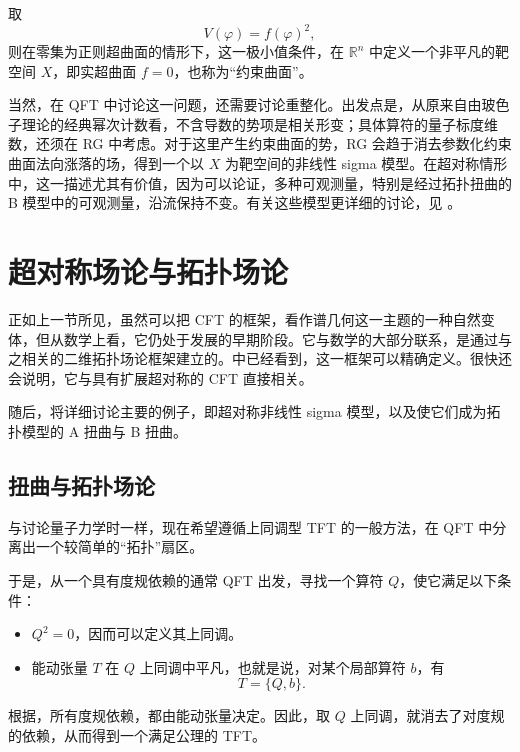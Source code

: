 \begin{example*}
取
\[
V(\varphi)=f(\varphi)^2,
\]
则在零集为正则超曲面的情形下，这一极小值条件，在 $\mathbb{R}^n$ 中定义一个非平凡的靶空间 $X$，即实超曲面 $f=0$，也称为“约束曲面”。
\end{example*}

当然，在 QFT 中讨论这一问题，还需要讨论重整化。出发点是，从原来自由玻色子理论的经典幂次计数看，不含导数的势项是相关形变；具体算符的量子标度维数，还须在 RG 中考虑。对于这里产生约束曲面的势，RG 会趋于消去参数化约束曲面法向涨落的场，得到一个以 $X$ 为靶空间的非线性 sigma 模型。在超对称情形中，这一描述尤其有价值，因为可以论证，多种可观测量，特别是经过拓扑扭曲的 B 模型中的可观测量，沿流保持不变。有关这些模型更详细的讨论，见 。

\section{超对称场论与拓扑场论}\label{sec:3.3}

正如上一节所见，虽然可以把 CFT 的框架，看作谱几何这一主题的一种自然变体，但从数学上看，它仍处于发展的早期阶段。它与数学的大部分联系，是通过与之相关的二维拓扑场论框架建立的。中已经看到，这一框架可以精确定义。很快还会说明，它与具有扩展超对称的 CFT 直接相关。

随后，将详细讨论主要的例子，即超对称非线性 sigma 模型，以及使它们成为拓扑模型的 A 扭曲与 B 扭曲。

\subsection{扭曲与拓扑场论}\label{sec:3.3.1}

与讨论量子力学时一样，现在希望遵循上同调型 TFT 的一般方法，在 QFT 中分离出一个较简单的“拓扑”扇区。

于是，从一个具有度规依赖的通常 QFT 出发，寻找一个算符 $Q$，使它满足以下条件：
\begin{definition*}\label{def:3.cohomological-tft-sector}
\begin{itemize}
\item $Q^2=0$，因而可以定义其上同调。
\item 能动张量 $T$ 在 $Q$ 上同调中平凡，也就是说，对某个局部算符 $b$，有
\begin{equation}\label{eq:3.80}
T=\{Q,b\}.
\end{equation}
\end{itemize}
\end{definition*}
根据，所有度规依赖，都由能动张量决定。因此，取 $Q$ 上同调，就消去了对度规的依赖，从而得到一个满足公理的 TFT。

